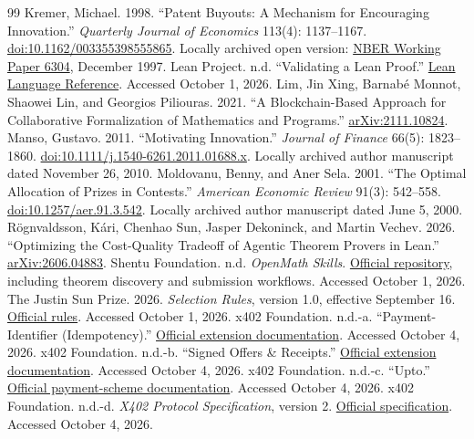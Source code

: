 \documentclass[11pt,a4paper]{article}
\begin{document}
\begin{thebibliography}{99}
 Kremer, Michael. 1998. ``Patent Buyouts: A Mechanism for Encouraging Innovation.'' \emph{Quarterly Journal of Economics} 113(4): 1137--1167. \href{https://doi.org/10.1162/003355398555865}{doi:10.1162/003355398555865}. Locally archived open version: \href{https://www.nber.org/system/files/working_papers/w6304/w6304.pdf}{NBER Working Paper 6304}, December 1997.
 Lean Project. n.d. ``Validating a Lean Proof.'' \href{https://lean-lang.org/doc/reference/latest/ValidatingProofs/}{Lean Language Reference}. Accessed October 1, 2026.
 Lim, Jin Xing, Barnab\'e Monnot, Shaowei Lin, and Georgios Piliouras. 2021. ``A Blockchain-Based Approach for Collaborative Formalization of Mathematics and Programs.'' \href{https://arxiv.org/abs/2111.10824}{arXiv:2111.10824}.
 Manso, Gustavo. 2011. ``Motivating Innovation.'' \emph{Journal of Finance} 66(5): 1823--1860. \href{https://doi.org/10.1111/j.1540-6261.2011.01688.x}{doi:10.1111/j.1540-6261.2011.01688.x}. Locally archived author manuscript dated November 26, 2010.
 Moldovanu, Benny, and Aner Sela. 2001. ``The Optimal Allocation of Prizes in Contests.'' \emph{American Economic Review} 91(3): 542--558. \href{https://doi.org/10.1257/aer.91.3.542}{doi:10.1257/aer.91.3.542}. Locally archived author manuscript dated June 5, 2000.
 R\"ognvaldsson, K\'ari, Chenhao Sun, Jasper Dekoninck, and Martin Vechev. 2026. ``Optimizing the Cost-Quality Tradeoff of Agentic Theorem Provers in Lean.'' \href{https://arxiv.org/abs/2606.04883}{arXiv:2606.04883}.
 Shentu Foundation. n.d. \emph{OpenMath Skills}. \href{https://github.com/shentufoundation/openmath-skills}{Official repository}, including theorem discovery and submission workflows. Accessed October 1, 2026.
 The Justin Sun Prize. 2026. \emph{Selection Rules}, version 1.0, effective September 16. \href{https://www.hejustinsun.com/prize/rules}{Official rules}. Accessed October 1, 2026.
 x402 Foundation. n.d.-a. ``Payment-Identifier (Idempotency).'' \href{https://docs.x402.org/extensions/payment-identifier}{Official extension documentation}. Accessed October 4, 2026.
 x402 Foundation. n.d.-b. ``Signed Offers \& Receipts.'' \href{https://docs.x402.org/extensions/offer-receipt}{Official extension documentation}. Accessed October 4, 2026.
 x402 Foundation. n.d.-c. ``Upto.'' \href{https://docs.x402.org/schemes/upto}{Official payment-scheme documentation}. Accessed October 4, 2026.
 x402 Foundation. n.d.-d. \emph{X402 Protocol Specification}, version 2. \href{https://github.com/x402-foundation/x402/blob/main/specs/x402-specification-v2.md}{Official specification}. Accessed October 4, 2026.
\end{thebibliography}
\end{document}
